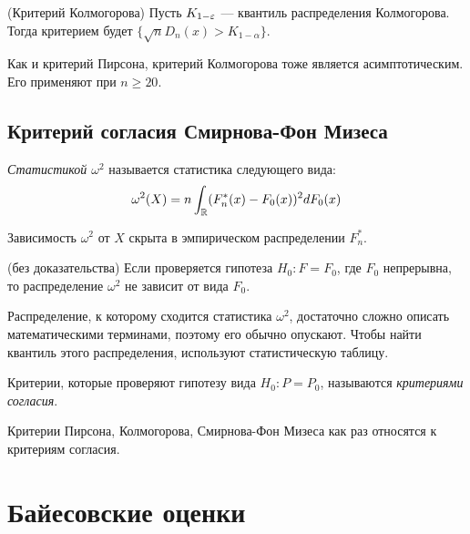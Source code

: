 \begin{solution} (Критерий Колмогорова)
	Пусть $K_{1 - \varepsilon}$ --- квантиль распределения Колмогорова. Тогда критерием будет $\{\sqrt{n}D_n(x) > K_{1 - \alpha}\}$.
\end{solution}

\begin{note}
	Как и критерий Пирсона, критерий Колмогорова тоже является асимптотическим. Его применяют при $n \ge 20$.
\end{note}

\subsection{Критерий согласия Смирнова-Фон Мизеса}

\begin{definition}
	\textit{Статистикой $\omega^2$} называется статистика следующего вида:
	\[
		\omega^2(X) = n\int_{\mathbb{R}} (F_n^*(x) - F_0(x))^2dF_0(x)
	\]
\end{definition}

\begin{anote}
	Зависимость $\omega^2$ от $X$ скрыта в эмпирическом распределении $F_n^*$.
\end{anote}

\begin{theorem} (без доказательства)
	Если проверяется гипотеза $H_0 \colon F = F_0$, где $F_0$ непрерывна, то распределение $\omega^2$ не зависит от вида $F_0$.
\end{theorem}

\begin{anote}
	Распределение, к которому сходится статистика $\omega^2$, достаточно сложно описать математическими терминами, поэтому его обычно опускают. Чтобы найти квантиль этого распределения, используют статистическую таблицу.
\end{anote}

\begin{definition}
	Критерии, которые проверяют гипотезу вида $H_0 \colon P = P_0$, называются \textit{критериями согласия}.
\end{definition}

\begin{note}
	Критерии Пирсона, Колмогорова, Смирнова-Фон Мизеса как раз относятся к критериям согласия.
\end{note}

\section{Байесовские оценки}

